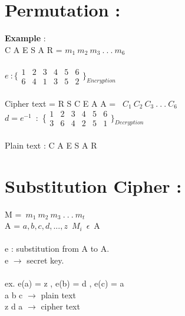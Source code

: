 \documentclass[11pt]{article}
\begin{document}
\section{Permutation :}
\textbf{Example} : \\
C A E S A R = $m_1\ m_2\ m_3\ .\ .\ .\ m_6$ \\\\

$e\ : \{ \begin{array}{cccccc}
     1 & 2 & 3 & 4 & 5 & 6 \\
     6 & 4 & 1 & 3 & 5 & 2
\end{array}
\}_{Encryption}$
\\\\
Cipher text = R S C E A A = \ $C_1\ C_2\ C_3\ .\ .\ .\ C_6$ \\

$d = e^{-1}$\ :\  \{$\begin{array}{cccccc}
     1 & 2 & 3 & 4 & 5 & 6 \\
     3 & 6 & 4 & 2 & 5 & 1
\end{array}\}_{Decryption}$
\\\\
Plain text : C A E S A R

\section{Substitution Cipher : }
M =\ $m_1 \  m_2 \ m_3 \  .\  .\  .\  m_t $\\
A = \(a,b,c,d,...,z\)\ $M_i$\ $\epsilon$\ A \\\\
e : substitution from A to A.\\
e $\xrightarrow{}$ secret key. \\\\
ex. e(a) = z , e(b) = d , e(c) = a \\
a b c $\xrightarrow{}$ plain text \\
z d a $\xrightarrow{}$ cipher text
\end{document}
